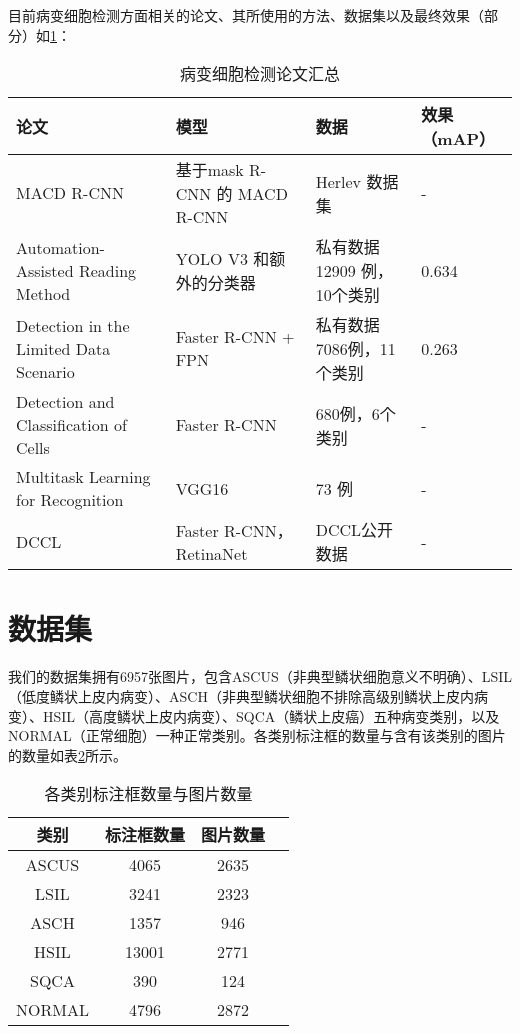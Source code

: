 \par 目前病变细胞检测方面相关的论文、其所使用的方法、数据集以及最终效果（部分）如\ref{tab:检测论文}：
\begin{table}[htbp]
    \center
    \tiny
    \caption{病变细胞检测论文汇总}
    \begin{tabular}{p{120pt}p{100pt}p{85pt}p{35pt}}
        \hline
        论文                                                             & 模型                         & 数据                       & 效果（mAP） \\
        \hline
        MACD R-CNN\cite{ma2020macd}                                      & 基于mask R-CNN 的 MACD R-CNN & Herlev 数据集              & -           \\
        Automation-Assisted Reading Method\cite{xiang2020novel}          & YOLO V3 和额外的分类器       & 私有数据12909 例，10个类别 & 0.634       \\
        Detection in the Limited Data Scenario\cite{liang2018comparison} & Faster R-CNN + FPN           & 私有数据7086例，11个类别   & 0.263       \\
        Detection and Classification of Cells\cite{li2019detection}      & Faster R-CNN                 & 680例，6个类别             & -           \\
        Multitask Learning for Recognition\cite{liu2018multitask}        & VGG16                        & 73 例                      & -           \\
        DCCL\cite{zhang2019dccl}                                         & Faster R-CNN，RetinaNet      & DCCL公开数据               & -           \\
        \hline
    \end{tabular}
    \label{tab:检测论文}
\end{table}

\section{数据集}
\par 我们的数据集拥有6957张图片，包含ASCUS（非典型鳞状细胞意义不明确）、LSIL（低度鳞状上皮内病变）、ASCH（非典型鳞状细胞不排除高级别鳞状上皮内病变）、HSIL（高度鳞状上皮内病变）、SQCA（鳞状上皮癌）五种病变类别，以及NORMAL（正常细胞）一种正常类别。各类别标注框的数量与含有该类别的图片的数量如表\ref{tab:类别}所示。

\begin{table}[htbp]
    \center
    \caption{各类别标注框数量与图片数量}
    \begin{tabular}{cccc}
        \hline
        类别 & 标注框数量 & 图片数量 \\
        \hline
        ASCUS & 4065 & 2635 \\
        LSIL & 3241 & 2323 \\
        ASCH & 1357 & 946 \\
        HSIL & 13001 & 2771 \\
        SQCA & 390 & 124 \\
        NORMAL & 4796 & 2872 \\
        \hline
    \end{tabular}
    \label{tab:类别}
\end{table}

